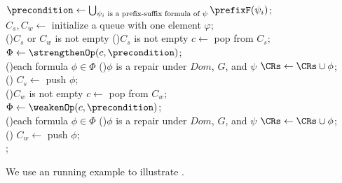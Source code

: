 \begin{algorithm}[h]
    \caption{\resolver}\label{alg:resolver}

    $\precondition \gets \bigcup_{\psi_i \text{ is a prefix-suffix formula of }\psi } \prefixF(\psi_i)$;\\
    $C_s,C_w \gets$ initialize a queue with one element $\varphi$;\\
    \While(){$C_s$ or $C_w$ is not empty}{
        \If(){$C_s$ is not empty}{
            $c \gets$ pop from $C_s$;\\
            $\Phi \gets \strengthenOp(c,\precondition)$;\\
            \For(){each formula $\phi \in \Phi$}{
                \If(){$\phi$ is a repair under $Dom$, $G$, and $\psi$}{
                    $\CRs \gets \CRs \cup \phi$;\\
                }
                \Else(){
                    $C_s \gets$ push $\phi$;\\
                }
            }
        }
        \If(){$C_w$ is not empty}{
            $c \gets$ pop from $C_w$;\\
            $\Phi \gets \weakenOp(c,\precondition)$;\\
            \For(){each formula $\phi \in \Phi$}{
                \If(){$\phi$ is a repair under $Dom$, $G$, and $\psi$}{
                    $\CRs \gets \CRs \cup \phi$;\\
                }
                \Else(){
                    $C_w \gets$ push $\phi$;\\
                }
            }
        }
    }
    \Return{$\CRs$};\\
\end{algorithm}

We use an running example to illustrate \resolver.
\begin{example}

\end{example}
